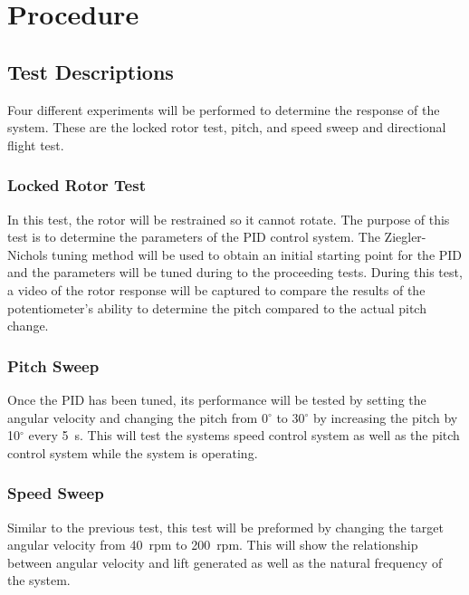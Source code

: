     \section{Procedure}
        \subsection{Test Descriptions}
            Four different experiments will be performed to determine the response of the system. These are the locked rotor test, pitch, and speed sweep and directional flight test.
                \subsubsection{Locked Rotor Test}
                    In this test, the rotor will be restrained so it cannot rotate. The purpose of this test is to determine the parameters of the PID control system. The Ziegler-Nichols tuning method \citep{ControlSystem} will be used to obtain an initial starting point for the PID and the parameters will be tuned during to the proceeding tests. During this test, a video of the rotor response will be captured to compare the results of the potentiometer's ability to determine the pitch compared to the actual pitch change.
                \subsubsection{Pitch Sweep}
                    Once the PID has been tuned, its performance will be tested by setting the angular velocity and changing the pitch from 0\(^\circ\) to 30\(^\circ\) by increasing the pitch by 10\(^\circ\) every 5~s. This will test the systems speed control system as well as the pitch control system while the system is operating.
                \subsubsection{Speed Sweep}
                    Similar to the previous test, this test will be preformed by changing the target angular velocity from 40~rpm to 200~rpm. This will show the relationship between angular velocity and lift generated as well as the natural frequency of the system.
